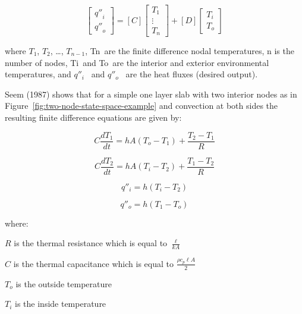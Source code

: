 \begin{equation}
\left[ {\begin{array}{ccc}{{{q''}_i}}\\ {{{q''}_o}}\end{array}} \right] = \left[ C \right]\left[ {\begin{array}{ccc}{{T_1}}\\ \vdots \\ {{T_n}}\end{array}} \right] + \left[ D \right]\left[ {\begin{array}{ccc}{{T_i}}\\ {{T_o}}\end{array}} \right]
\end{equation}

where \(T_1\), \(T_2\), \ldots{}, \(T_{n-1}\), Tn~are the finite difference nodal temperatures, n is the number of nodes, Ti~and To~are the interior and exterior environmental temperatures, and \({q''_i}\) ~and \({q''_o}\) ~are the heat fluxes (desired output).

Seem (1987) shows that for a simple one layer slab with two interior nodes as in Figure~\ref{fig:two-node-state-space-example} and convection at both sides the resulting finite difference equations are given by:

\begin{equation}
C\frac{{d{T_1}}}{{dt}} = hA\left( {{T_o} - {T_1}} \right) + \frac{{{T_2} - {T_1}}}{R}
\end{equation}

\begin{equation}
C\frac{{d{T_2}}}{{dt}} = hA\left( {{T_i} - {T_2}} \right) + \frac{{{T_1} - {T_2}}}{R}
\end{equation}

\begin{equation}
{q''_i} = h\left( {{T_i} - {T_2}} \right)
\end{equation}

\begin{equation}
{q''_o} = h\left( {{T_1} - {T_o}} \right)
\end{equation}

where:

\(R\) is the thermal resistance which is equal to \(\frac{\ell }{{kA}}\)

\(C\) is the thermal capacitance which is equal to \(\frac{{\rho {c_p}\ell A}}{2}\)

\({T_o}\) is the outside temperature

\({T_i}\) is the inside temperature

